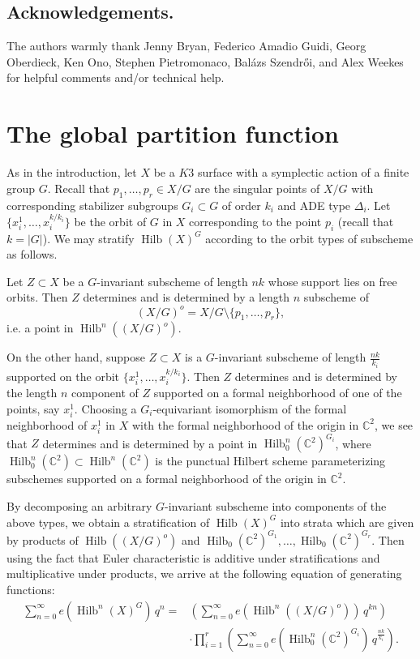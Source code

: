 \documentclass{amsart}
\theoremstyle{definition}
\newcommand{\CC} {{\mathbb C}}          %
\newcommand{\Hilb}{\operatorname{Hilb}}
\begin{document}
\subsection{Acknowledgements.} The authors warmly thank Jenny Bryan,
Federico Amadio Guidi, Georg Oberdieck, Ken Ono, Stephen Pietromonaco,
Bal\'azs Szendr\H{o}i, and Alex Weekes for helpful comments and/or
technical help.


\section{The global partition function}\label{sec: the global series}

As in the introduction, let $X$ be a $K3$ surface with a symplectic
action of a finite group $G$.  Recall that $p_{1},\dotsc ,p_{r}\in
X/G$ are the singular points of $X/G$ with corresponding stabilizer
subgroups $G_{i}\subset G$ of order $k_{i}$ and ADE type
$\Delta_{i}$. Let $\{x_{i}^{1},\dotsc ,x_{i}^{k/k_{i}} \}$ be the
orbit of $G$ in $X$ corresponding to the point $p_{i}$ (recall that
$k=|G|$).  We may stratify $\Hilb (X)^{G}$ according to the orbit
types of subscheme as follows.

Let $Z\subset X$ be a $G$-invariant subscheme of length $nk$ whose
support lies on free orbits. Then $Z$ determines and is determined by
a length $n$ subscheme of 
\[
(X/G)^{o}  = X/G\setminus \{p_{1},\dotsc ,p_{r} \},
\]
i.e. a point
in $\Hilb^{n}((X/G)^{o})$.

On the other hand, suppose $Z\subset X$ is a $G$-invariant subscheme
of length $\frac{nk}{k_{i}}$ supported on the orbit
$\{x_{i}^{1},\dotsc ,x_{i}^{k/k_{i}} \}$. Then $Z$ determines and is
determined by the length $n$ component of $Z$ supported on a formal
neighborhood of one of the points, say $x_{i}^{1}$. Choosing a
$G_{i}$-equivariant isomorphism of the formal neighborhood of
$x_{i}^{1}$ in $X$ with the formal neighborhood of the origin in
$\CC^{2}$, we see that $Z$ determines and is determined by a point in
$\Hilb_{0}^{n}(\CC^{2})^{G_{i}}$, where $\Hilb_{0}^{n}(\CC^{2})\subset
\Hilb^{n}(\CC^{2})$ is the punctual Hilbert scheme parameterizing
subschemes supported on a formal neighborhood of the origin in
$\CC^{2}$.

By decomposing an arbitrary $G$-invariant subscheme into components of
the above types, we obtain a stratification of $\Hilb (X)^{G}$ into
strata which are given by products of $\Hilb ((X/G)^{o})$ and
$\Hilb_{0}(\CC^{2})^{G_{1}},\dotsc ,\Hilb_{0}(\CC^{2})^{G_{r}}$. Then
using the fact that Euler characteristic is additive under
stratifications and multiplicative under products, we arrive at the
following equation of generating functions:
\begin{align}\label{eqn: stratification formula for sum e(hilb(X)G)}
\nonumber\sum_{n=0}^{\infty} e\left(\Hilb^{n}(X)^{G} \right)\, q^{n}
=&\left(\sum_{n=0}^{\infty} e\left(\Hilb^{n}((X/G)^{o}) \right)\,
q^{kn} \right)\\
& \cdot \prod_{i=1}^{r}\left( \sum_{n=0}^{\infty}
e\left(\Hilb_{0}^{n}(\CC^{2})^{G_{i}} \right) \, q^{\frac{nk}{k_{i}}}
\right) .
\end{align}
\end{document}
